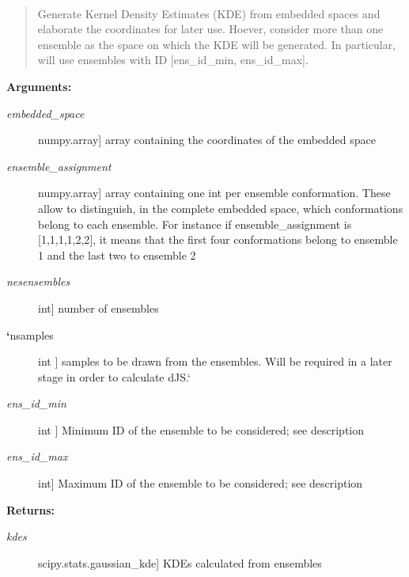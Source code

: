 \documentclass[letterpaper,10pt,english]{sphinxmanual}
\begin{document}

\begin{fulllineitems}
\label{index:encore.similarity.cumulative_gen_kde_pdfs}~\begin{quote}

Generate Kernel Density Estimates (KDE) from embedded spaces and elaborate the coordinates for later use. Hoever, consider more than one ensemble as the space on which the KDE will be generated. In particular, will use ensembles with ID {[}ens\_id\_min, ens\_id\_max{]}.
\end{quote}

\textbf{Arguments:}
\begin{description}
\item[{\emph{embedded\_space}}] \leavevmode{[}numpy.array{]}
array containing the coordinates of the embedded space

\item[{\emph{ensemble\_assignment}}] \leavevmode{[}numpy.array{]}
array containing one int per ensemble conformation. These allow to distinguish, in the complete embedded space, which conformations belong to each ensemble. For instance if ensemble\_assignment is {[}1,1,1,1,2,2{]}, it means that the first four conformations belong to ensemble 1 and the last two to ensemble 2

\item[{\emph{nesensembles}}] \leavevmode{[}int{]}
number of ensembles

\item[{{\color{red}\bfseries{}{}`}nsamples}] \leavevmode{[}int {]}
samples to be drawn from the ensembles. Will be required in a later stage in order to calculate dJS.{}`

\item[{\emph{ens\_id\_min}}] \leavevmode{[}int {]}
Minimum ID of the ensemble to be considered; see description

\item[{\emph{ens\_id\_max}}] \leavevmode{[}int{]}
Maximum ID of the ensemble to be considered; see description

\end{description}

\textbf{Returns:}
\begin{description}
\item[{\emph{kdes}}] \leavevmode{[}scipy.stats.gaussian\_kde{]}
KDEs calculated from ensembles


\end{description}
\end{fulllineitems}
\end{document}
